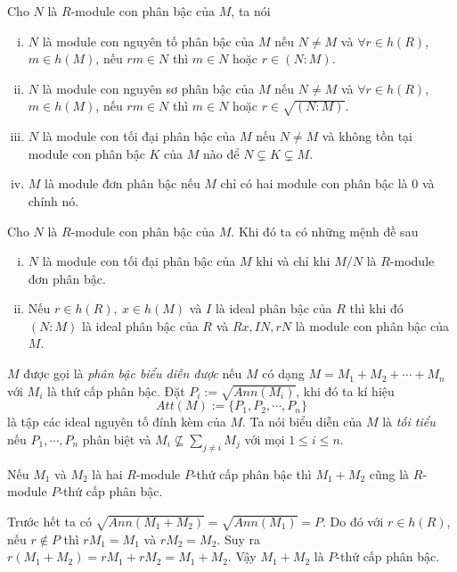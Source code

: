 \begin{define}
    Cho $N$ là $R$-module con phân bậc của $M$, ta nói
    \begin{enumerate}[(i)]
        \item $N$ là module con nguyên tố phân bậc của $M$ nếu $N \neq M$ và $\forall r \in h(R)$, $m \in h(M)$, nếu $rm \in N$ thì $m \in N$ hoặc $r \in (N:M)$.
        \item $N$ là module con nguyên sơ phân bậc của $M$ nếu $N \neq M$ và $\forall r \in h(R)$, $m \in h(M)$, nếu $rm \in N$ thì $m \in N$ hoặc $r \in \sqrt{(N:M)}$.
        \item $N$ là module con tối đại phân bậc của $M$ nếu $N \neq M$ và không tồn tại module con phân bậc $K$ của $M$ nào để $N \subsetneq K \subsetneq M$.
        \item $M$ là module đơn phân bậc nếu $M$ chỉ có hai module con phân bậc là $0$ và chính nó.
    \end{enumerate}
\end{define}

\begin{lemma}
    \label{lem1}
    Cho $N$ là $R$-module con phân bậc của $M$. Khi đó ta có những mệnh đề sau
    \begin{enumerate}[(i)]
        \item $N$ là module con tối đại phân bậc của $M$ khi và chỉ khi $M / N$ là $R$-module đơn phân bậc.
        \item Nếu $r \in h(R),\ x \in h(M)$ và $I$ là ideal phân bậc của $R$ thì khi đó $(N:M)$ là ideal phân bậc của $R$ và $Rx,IN,rN$ là module con phân bậc của $M$.
    \end{enumerate}
\end{lemma}

\begin{define}
    $M$ được gọi là \textit{phân bậc biểu diễn được} nếu $M$ có dạng $M = M_1 + M_2 + \cdots + M_n$ với $M_i$ là thứ cấp phân bậc. Đặt $P_i := \sqrt{Ann(M_i)}$, khi đó ta kí hiệu
    $$
        Att(M) := \{P_1, P_2, \cdots,P_n\}
    $$
    là tập các ideal nguyên tố đính kèm của $M$. Ta nói biểu diễn của $M$ là \textit{tối tiểu} nếu $P_1,\cdots,P_n$ phân biệt và $M_i \not\subseteq \sum_{j\neq i} M_j$ với mọi $1 \leq i \leq n$.
\end{define}

\begin{lemma}
    \label{lem:rep}
    Nếu $M_1$ và $M_2$ là hai $R$-module $P$-thứ cấp phân bậc thì $M_1 + M_2$ cũng là $R$-module $P$-thứ cấp phân bậc.
\end{lemma}
\startproof Trước hết ta có $\sqrt{Ann(M_1 + M_2)} = \sqrt{Ann(M_1)} = P$. Do đó với $r \in h(R)$, nếu $r \notin P$ thì $rM_1 = M_1$ và $rM_2 = M_2$. Suy ra $r(M_1 + M_2) = rM_1 + rM_2 = M_1 + M_2$. Vậy $M_1 + M_2$ là $P$-thứ cấp phân bậc. \QED

